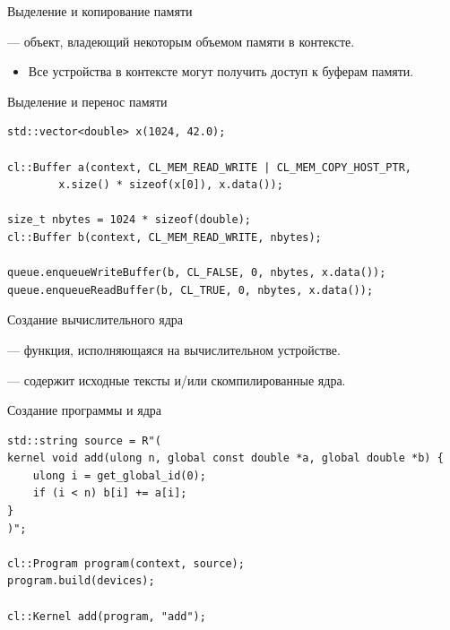 \documentclass[@BEAMER_OPTIONS@]{beamer}
\begin{document}
\begin{frame}[fragile]{Выделение и копирование памяти}
    \begin{description}[\;\;]
        \item[Буфер памяти] --- объект, владеющий некоторым объемом памяти в
            контексте.
            \begin{itemize}
                \item Все устройства в контексте могут получить доступ к
                    буферам памяти.
            \end{itemize}
    \end{description}
    \begin{exampleblock}{Выделение и перенос памяти}
        \begin{lstlisting}
std::vector<double> x(1024, 42.0);

cl::Buffer a(context, CL_MEM_READ_WRITE | CL_MEM_COPY_HOST_PTR,
        x.size() * sizeof(x[0]), x.data());

size_t nbytes = 1024 * sizeof(double);
cl::Buffer b(context, CL_MEM_READ_WRITE, nbytes);

queue.enqueueWriteBuffer(b, CL_FALSE, 0, nbytes, x.data());
queue.enqueueReadBuffer(b, CL_TRUE, 0, nbytes, x.data());
        \end{lstlisting}
    \end{exampleblock}
\end{frame}

\begin{frame}[fragile]{Создание вычислительного ядра}
    \begin{description}[\;\;]
        \item[Ядро] --- функция, исполняющаяся на вычислительном устройстве.
        \item[Программа] --- содержит исходные тексты и/или скомпилированные
            ядра.
    \end{description}
    \begin{exampleblock}{Создание программы и ядра}
        \begin{lstlisting}
std::string source = R"(
kernel void add(ulong n, global const double *a, global double *b) {
    ulong i = get_global_id(0);
    if (i < n) b[i] += a[i];
}
)";

cl::Program program(context, source);
program.build(devices);

cl::Kernel add(program, "add");
        \end{lstlisting}
    \end{exampleblock}
\end{frame}
\end{document}
